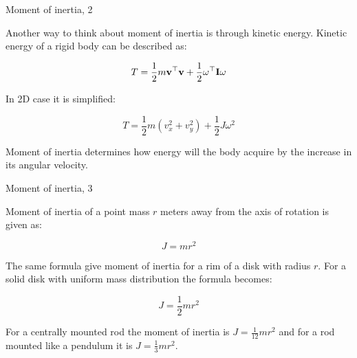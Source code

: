 \documentclass{beamer}
\begin{document}
\begin{frame}{Moment of inertia, 2}
	\begin{flushleft}
		
		Another way to think about moment of inertia is through kinetic energy. Kinetic energy of a rigid body can be described as:
		
		\begin{equation}
			T = \frac{1}{2} m \mathbf{v}^\top \mathbf{v} + \frac{1}{2} \omega^\top \mathbf{I} \omega
		\end{equation}			 
		
		In 2D case it is simplified:
		
		\begin{equation}
			T = \frac{1}{2} m (v_x^2 + v_y^2) + \frac{1}{2} J \omega^2
		\end{equation}		
		
		Moment of inertia determines how energy will the body acquire by the increase in its angular velocity.
		
	\end{flushleft}
\end{frame}



\begin{frame}{Moment of inertia, 3}
	\begin{flushleft}
		
		Moment of inertia of a point mass $r$ meters away from the axis of rotation is given as:
		
		\begin{equation}
			J =m  r^2
		\end{equation}				
	
		The same formula give moment of inertia for a rim of a disk with radius $r$. For a solid disk with uniform mass distribution the formula becomes:
		
		\begin{equation}
			J =\frac{1}{2} m  r^2
		\end{equation}				
		
		For a centrally mounted rod the moment of inertia is $J =\frac{1}{12} m  r^2$ and for a rod mounted like a pendulum it is $J =\frac{1}{3} m  r^2$.
		
	\end{flushleft}
\end{frame}
\end{document}
